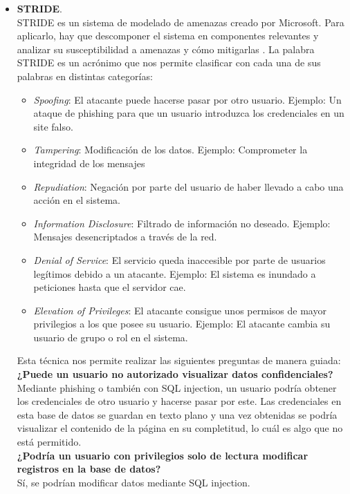 \documentclass[a4paper,oneside]{article}
\begin{document}
\begin{itemize}
\item \textbf{STRIDE}.\\
STRIDE es un sistema de modelado de amenazas creado por Microsoft. Para aplicarlo, hay que descomponer el sistema en componentes relevantes y analizar su susceptibilidad a amenazas y cómo mitigarlas \cite{stride}. La palabra STRIDE es un acrónimo que nos permite clasificar con cada una de sus palabras en distintas categorías:
\begin{itemize}
\item \textit{Spoofing}: El atacante puede hacerse pasar por otro usuario. Ejemplo: Un ataque de phishing para que un usuario introduzca los credenciales en un site falso.
\item \textit{Tampering}: Modificación de los datos. Ejemplo: Comprometer la integridad de los mensajes 
\item \textit{Repudiation}: Negación por parte del usuario de haber llevado a cabo una acción en el sistema.
\item \textit{Information Disclosure}: Filtrado de información no deseado. Ejemplo: Mensajes desencriptados a través de la red.
\item \textit{Denial of Service}: El servicio queda inaccesible por parte de usuarios legítimos debido a un atacante. Ejemplo: El sistema es inundado a peticiones hasta que el servidor cae.
\item \textit{Elevation of Privileges}: El atacante consigue unos permisos de mayor privilegios a los que posee su usuario. Ejemplo: El atacante cambia su usuario de grupo o rol en el sistema.
\end{itemize}

Esta técnica nos permite realizar las siguientes preguntas de manera guiada:\\

\textbf{¿Puede un usuario no autorizado visualizar datos confidenciales?}\\
Mediante phishing o también con SQL injection, un usuario podría obtener los credenciales de otro usuario y hacerse pasar por este. Las credenciales en esta base de datos se guardan en texto plano y una vez obtenidas se podría visualizar el contenido de la página en su completitud, lo cuál es algo que no está permitido.\\

\textbf{¿Podría un usuario con privilegios solo de lectura modificar registros en
la base de datos?}\\
Sí, se podrían modificar datos mediante SQL injection.\\


\end{itemize}
\end{document}
